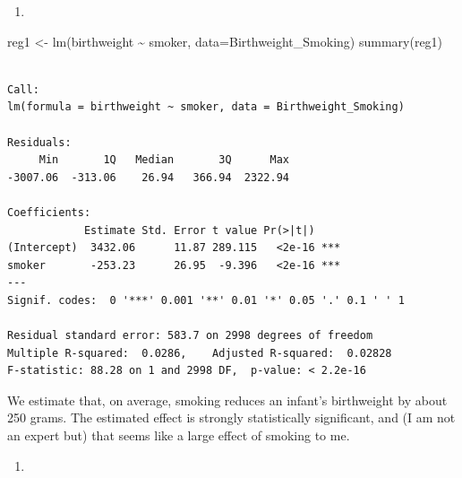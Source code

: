 \documentclass[
  letterpaper,
  DIV=11,
  numbers=noendperiod]{scrreprt}
\newenvironment{Shaded}{\begin{snugshade}}{\end{snugshade}}
\newcommand{\AttributeTok}[1]{\textcolor[rgb]{0.40,0.45,0.13}{#1}}
\newcommand{\CommentTok}[1]{\textcolor[rgb]{0.37,0.37,0.37}{#1}}
\newcommand{\DecValTok}[1]{\textcolor[rgb]{0.68,0.00,0.00}{#1}}
\newcommand{\FunctionTok}[1]{\textcolor[rgb]{0.28,0.35,0.67}{#1}}
\newcommand{\NormalTok}[1]{\textcolor[rgb]{0.00,0.23,0.31}{#1}}
\newcommand{\OtherTok}[1]{\textcolor[rgb]{0.00,0.23,0.31}{#1}}
\newcommand{\SpecialCharTok}[1]{\textcolor[rgb]{0.37,0.37,0.37}{#1}}
\newcommand{\StringTok}[1]{\textcolor[rgb]{0.13,0.47,0.30}{#1}}
\providecommand{\tightlist}{%
  \setlength{\itemsep}{0pt}\setlength{\parskip}{0pt}}\usepackage{longtable,booktabs,array}
\begin{document}
\begin{enumerate}
\def\labelenumi{\arabic{enumi}.}
\tightlist
\item
\end{enumerate}

\begin{Shaded}
\begin{Highlighting}[]
\NormalTok{reg1 }\OtherTok{\textless{}{-}} \FunctionTok{lm}\NormalTok{(birthweight }\SpecialCharTok{\textasciitilde{}}\NormalTok{ smoker, }\AttributeTok{data=}\NormalTok{Birthweight\_Smoking)}
\FunctionTok{summary}\NormalTok{(reg1)}
\end{Highlighting}
\end{Shaded}

\begin{verbatim}

Call:
lm(formula = birthweight ~ smoker, data = Birthweight_Smoking)

Residuals:
     Min       1Q   Median       3Q      Max 
-3007.06  -313.06    26.94   366.94  2322.94 

Coefficients:
            Estimate Std. Error t value Pr(>|t|)    
(Intercept)  3432.06      11.87 289.115   <2e-16 ***
smoker       -253.23      26.95  -9.396   <2e-16 ***
---
Signif. codes:  0 '***' 0.001 '**' 0.01 '*' 0.05 '.' 0.1 ' ' 1

Residual standard error: 583.7 on 2998 degrees of freedom
Multiple R-squared:  0.0286,    Adjusted R-squared:  0.02828 
F-statistic: 88.28 on 1 and 2998 DF,  p-value: < 2.2e-16
\end{verbatim}

We estimate that, on average, smoking reduces an infant's birthweight by
about 250 grams. The estimated effect is strongly statistically
significant, and (I am not an expert but) that seems like a large effect
of smoking to me.

\begin{enumerate}
\def\labelenumi{\arabic{enumi}.}
\setcounter{enumi}{1}
\tightlist
\item
\end{enumerate}

\begin{Shaded}
\end{Shaded}
\end{document}
